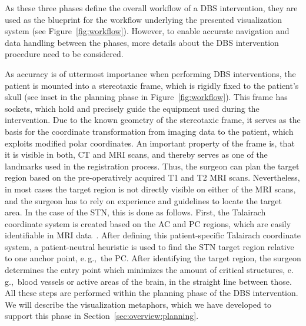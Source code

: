 \documentclass{vgtc}                          %
\begin{document}
As these three phases define the overall workflow of a DBS intervention, they are used as the blueprint for the workflow underlying the presented visualization system (see Figure~\ref{fig:workflow}). However, to enable accurate navigation and data handling between the phases, more details about the DBS intervention procedure need to be considered.

As accuracy is of uttermost importance when performing DBS interventions, the patient is mounted into a stereotaxic frame, which is rigidly fixed to the patient's skull (see inset in the planning phase in Figure~\ref{fig:workflow}). This frame has sockets, which hold and precisely guide the equipment used during the intervention. Due to the known geometry of the stereotaxic frame, it serves as the basis for the coordinate transformation from imaging data to the patient, which exploits modified polar coordinates. An important property of the frame is, that it is visible in both, CT and MRI scans, and thereby serves as one of the landmarks used in the registration process. Thus, the surgeon can plan the target region based on the pre-operatively acquired T1 and T2 MRI scans. Nevertheless, in most cases the target region is not directly visible on either of the MRI scans, and the surgeon has to rely on experience and guidelines to locate the target area. In the case of the STN, this is done as follows. First, the Talairach coordinate system is created based on the AC and PC regions, which are easily identifiable in MRI data~\cite{Talairach1993}. After defining this patient-specific Talairach coordinate system, a patient-neutral heuristic is used to find the STN target region relative to one anchor point, e.\,g.,~the PC. After identifying the target region, the surgeon determines the entry point which minimizes the amount of critical structures, e.\,g.,~blood vessels or active areas of the brain, in the straight line between those. All these steps are performed within the planning phase of the DBS intervention. We will describe the visualization metaphors, which we have developed to support this phase in Section~\ref{sec:overview:planning}.
\end{document}
